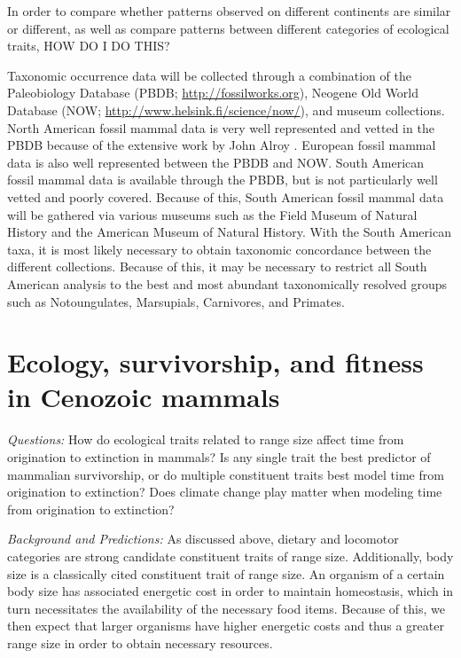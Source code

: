 \documentclass[12pt,letterpaper]{article}
\begin{document}
In order to compare whether patterns observed on different continents are similar or different, as well as compare patterns between different categories of ecological traits, HOW DO I DO THIS?

Taxonomic occurrence data will be collected through a combination of the Paleobiology Database (PBDB; \url{http://fossilworks.org}), Neogene Old World Database (NOW; \url{http://www.helsink.fi/science/now/}), and museum collections. North American fossil mammal data is very well represented and vetted in the PBDB because of the extensive work by John Alroy \citep{Alroy1996a,Alroy1998,Alroy2000g}. European fossil mammal data is also well represented between the PBDB and NOW. South American fossil mammal data is available through the PBDB, but is not particularly well vetted and poorly covered. Because of this, South American fossil mammal data will be gathered via various museums such as the Field Museum of Natural History and the American Museum of Natural History. With the South American taxa, it is most likely necessary to obtain taxonomic concordance between the different collections. Because of this, it may be necessary to restrict all South American analysis to the best and most abundant taxonomically resolved groups such as Notoungulates, Marsupials, Carnivores, and Primates.


\section{Ecology, survivorship, and fitness in Cenozoic mammals}

\textit{Questions:} 
How do ecological traits related to range size affect time from origination to extinction in mammals? Is any single trait the best predictor of mammalian survivorship, or do multiple constituent traits best model time from origination to extinction? Does climate change play matter when modeling time from origination to extinction?

\textit{Background and Predictions:} 
As discussed above, dietary and locomotor categories are strong candidate constituent traits of range size. Additionally, body size is a classically cited constituent trait of range size. An organism of a certain body size has associated energetic cost in order to maintain homeostasis, which in turn necessitates the availability of the necessary food items. Because of this, we then expect that larger organisms have higher energetic costs and thus a greater range size in order to obtain necessary resources. 
\end{document}

